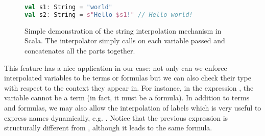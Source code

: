\begin{figure}[H]
  \centering
  \begin{lstlisting}[language=Scala]
val s1: String = "world"
val s2: String = s"Hello $s1!" // Hello world!
  \end{lstlisting}
  \caption[String interpolation general example]{Simple demonstration of the string interpolation mechanism in Scala. The  interpolator simply calls  on each variable passed and concatenates all the parts together.}
  \label{fig:string-interpolation-general}
\end{figure}

This feature has a nice application in our case: not only can we enforce interpolated variables to be terms or formulas but we can also check their type with respect to the context they appear in. For instance, in the expression , the variable  cannot be a term (in fact, it must be a formula). In addition to terms and formulas, we may also allow the interpolation of labels which is very useful to express names dynamically, e.g. . Notice that the previous expression is structurally different from , although it leads to the same formula.

